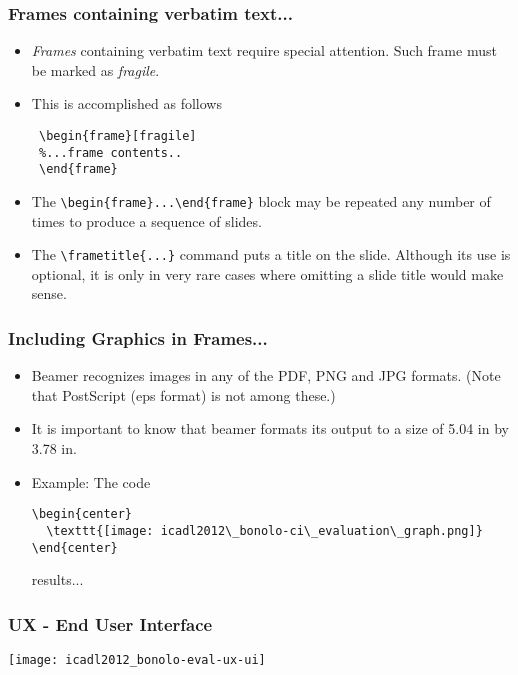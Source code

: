 \documentclass{beamer}
\begin{document}
\begin{frame}[fragile] %

\frametitle{Frames containing verbatim text...}

\begin{itemize}
\item \emph{Frames} containing verbatim text require special attention. Such frame must be marked as \emph{fragile}.
\item This is accomplished as follows

 \begin{verbatim}
 \begin{frame}[fragile]
 %...frame contents..
 \end{frame}
 \end{verbatim}

\item The \verb!\begin{frame}...\end{frame}! block may be repeated any number of times to produce a sequence of slides.
\item The \verb!\frametitle{...}! command puts a title on the slide. Although its use is optional, it is only in very rare cases where omitting a slide title would make sense.
\end{itemize}

\end{frame}

\begin{frame}[fragile]

\frametitle{Including Graphics in Frames...}

\begin{itemize}
\item Beamer recognizes images in any of the PDF, PNG and JPG formats. (Note that PostScript (eps format)  is not among these.)
\item It is important to know that beamer formats its output to a size of 5.04 in by 3.78 in.
\item Example: The code
\begin{verbatim}
\begin{center}
  \texttt{[image: icadl2012\_bonolo-ci\_evaluation\_graph.png]}
\end{center}
\end{verbatim}
results...
\end{itemize}
\end{frame}

\begin{frame}

\frametitle{UX - End User Interface}

\begin{center}
\texttt{[image: icadl2012\_bonolo-eval-ux-ui]}
\end{center}

\end{frame}
\end{document}
